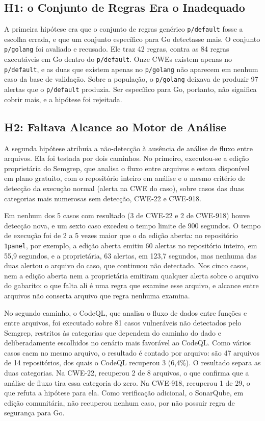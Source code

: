 \subsection{H1: o Conjunto de Regras Era o Inadequado}
\label{subsec:h1}

A primeira hipótese era que o conjunto de regras genérico \texttt{p/default} fosse a escolha errada, e que um conjunto específico para Go detectasse mais. O conjunto \texttt{p/golang} foi avaliado e recusado. Ele traz 42 regras, contra as 84 regras executáveis em Go dentro do \texttt{p/default}. Onze CWEs existem apenas no \texttt{p/default}, e as duas que existem apenas no \texttt{p/golang} não aparecem em nenhum caso da base de validação. Sobre a população, o \texttt{p/golang} deixava de produzir 97 alertas que o \texttt{p/default} produzia. Ser específico para Go, portanto, não significa cobrir mais, e a hipótese foi rejeitada.

\subsection{H2: Faltava Alcance ao Motor de Análise}
\label{subsec:h2}

A segunda hipótese atribuía a não-detecção à ausência de análise de fluxo entre arquivos. Ela foi testada por dois caminhos. No primeiro, executou-se a edição proprietária do Semgrep, que analisa o fluxo entre arquivos e estava disponível em plano gratuito, com o repositório inteiro em análise e o mesmo critério de detecção da execução normal (alerta na CWE do caso), sobre casos das duas categorias mais numerosas sem detecção, CWE-22 e CWE-918.

Em nenhum dos 5 casos com resultado (3 de CWE-22 e 2 de CWE-918) houve detecção nova, e um sexto caso excedeu o tempo limite de 900 segundos. O tempo de execução foi de 2 a 5 vezes maior que o da edição aberta: no repositório \texttt{1panel}, por exemplo, a edição aberta emitiu 60 alertas no repositório inteiro, em 55,9 segundos, e a proprietária, 63 alertas, em 123,7 segundos, mas nenhuma das duas alertou o arquivo do caso, que continuou não detectado. Nos cinco casos, nem a edição aberta nem a proprietária emitiram qualquer alerta sobre o arquivo do gabarito: o que falta ali é uma regra que examine esse arquivo, e alcance entre arquivos não conserta arquivo que regra nenhuma examina.

No segundo caminho, o CodeQL, que analisa o fluxo de dados entre funções e entre arquivos, foi executado sobre 81 casos vulneráveis não detectados pelo Semgrep, restritos às categorias que dependem do caminho do dado e deliberadamente escolhidos no cenário mais favorável ao CodeQL. Como vários casos caem no mesmo arquivo, o resultado é contado por arquivo: são 47 arquivos de 14 repositórios, dos quais o CodeQL recuperou 3 (6,4\%). O resultado separa as duas categorias. Na CWE-22, recuperou 2 de 8 arquivos, o que confirma que a análise de fluxo tira essa categoria do zero. Na CWE-918, recuperou 1 de 29, o que refuta a hipótese para ela. Como verificação adicional, o SonarQube, em edição comunitária, não recuperou nenhum caso, por não possuir regra de segurança para Go.

